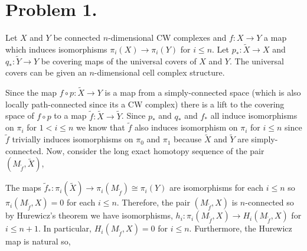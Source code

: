 \documentclass[12pt]{extarticle}
\begin{document}

 
\section*{Problem 1.}

Let $X$ and $Y$ be connected $n$-dimensional CW complexes and $f : X \to Y$ a map which induces isomorphisms $\pi_i(X) \to \pi_i(Y)$ for $i \le n$. Let $p_* : \tilde{X} \to X$ and $q_* : \tilde{Y} \to Y$ be covering maps of the universal covers of $X$ and $Y$. The universal covers can be given an $n$-dimensional cell complex structure.
\begin{center}
\end{center} 
Since the map $f \circ p : \tilde{X} \to Y$ is a map from a simply-connected space (which is also locally path-connected since its a CW complex) there is a lift to the covering space of $f \circ p$ to a map $\tilde{f} : \tilde{X} \to \tilde{Y}$. Since $p_*$ and $q_*$ and $f_*$ all induce isomorphisms on $\pi_i$ for $1 < i \le n$ we know that $\tilde{f}$ also induces isomorphism on $\pi_i$ for $i \le n$ since $\tilde{f}$ trivially induces isomorphisms on $\pi_0$ and $\pi_1$ because $\tilde{X}$ and $\tilde{Y}$ are simply-connected. Now, consider the long exact homotopy sequence of the pair $(M_{\tilde{f}}, \tilde{X})$,
\begin{center}
\end{center}
The maps $\tilde{f}_* : \pi_i(\tilde{X}) \to \pi_i(M_{\tilde{f}}) \cong \pi_i(Y)$ are isomorphisms for each $i \le n$ so $\pi_i(M_{\tilde{f}}, X) = 0$ for each $i \le n$. Therefore, the pair $(M_{\tilde{f}}, X)$ is $n$-connected so by Hurewicz's theorem we have isomorphisms, $h_i : \pi_i(M_{\tilde{f}}, X) \to H_i(M_{\tilde{f}}, X)$ for $i \le n+1$. In particular, $H_i(M_{\tilde{f}}, X) = 0$ for $i \le n$. Furthermore, the Hurewicz map is natural so,
\begin{center}
\end{center}
\end{document}
